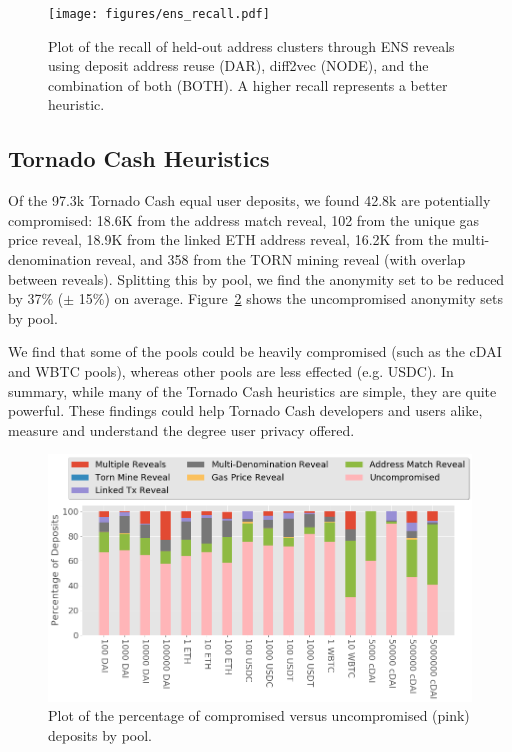 \begin{figure}[h!]
\texttt{[image: figures/ens\_recall.pdf]}
\caption{Plot of the recall of held-out address clusters through ENS reveals using deposit address reuse (DAR), diff2vec (NODE), and the combination of both (BOTH). A higher recall represents a better heuristic.}
\label{fig:ensrecall}
\end{figure}

\subsection{Tornado Cash Heuristics}

Of the 97.3k Tornado Cash equal user deposits, we found 42.8k are potentially compromised: 18.6K from the address match reveal, 102 from the unique gas price reveal, 18.9K from the linked ETH address reveal, 16.2K from the multi-denomination reveal, and 358 from the TORN mining reveal (with overlap between reveals). Splitting this by pool, we find the anonymity set to be reduced by 37\% ($\pm$ 15\%) on average. Figure~\ref{fig:tcashgraph} shows the uncompromised anonymity sets by pool.

We find that some of the pools could be heavily compromised (such as the cDAI and WBTC pools), whereas other pools are less effected (e.g. USDC). In summary, while many of the Tornado Cash heuristics are simple, they are quite powerful. These findings could help Tornado Cash developers and users alike, measure and understand the degree user privacy offered.

\begin{figure}[h!]
\includegraphics[width=\linewidth]{figures/tornado_graph.png}
\caption{Plot of the percentage of compromised versus uncompromised (pink) deposits by pool. }
\label{fig:tcashgraph}
\end{figure}